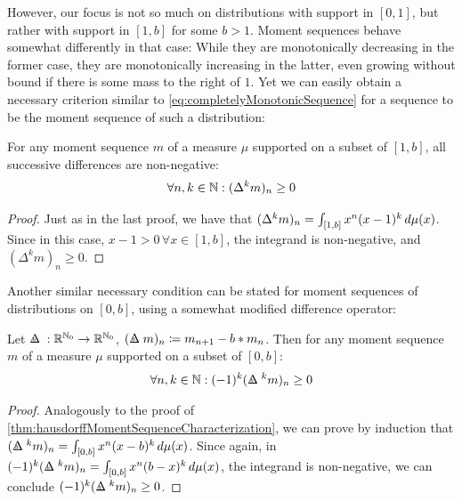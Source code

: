 \documentclass[a4paper]{scrreprt}
\begin{document}
    However, our focus is not so much on distributions with support in $[0, 1]$, but rather with support in $[1, b]$ for some $b > 1$.
    Moment sequences behave somewhat differently in that case: While they are monotonically decreasing in the former case, they are monotonically increasing in the latter, even growing without bound if there is some mass to the right of $1$.
    Yet we can easily obtain a necessary criterion similar to \eqref{eq:completelyMonotonicSequence} for a sequence to be the moment sequence of such a distribution:
    \begin{cor}
        For any moment sequence $m$ of a measure $\mu$ supported on a subset of $[1, b]$, all successive differences are non-negative:
        \begin{gather}
            \forall n, k \in \mathbb{N}: (\Delta^k m)_n \geq 0
        \end{gather}
        \label{cor:hausdorff-1-b-necessaryCondition}
    \end{cor}
    \begin{proof}
        Just as in the last proof, we have that $(\Delta^k m)_n = \int_{[1, b]} x^n (x-1)^k \, d\mu(x)$.
        Since in this case, $x-1 > 0 \,\forall x \in [1, b]$, the integrand is non-negative, and $(\Delta^k m)_n \geq 0$.
    \end{proof}

    Another similar necessary condition can be stated for moment sequences of distributions on $[0, b]$, using a somewhat modified difference operator:
    \newcommand{\DeltaB}[1]{\Delta\hspace{-.225cm}{\mathrel{\raisebox{0.045cm}{\scalebox{.9}{$\scriptscriptstyle#1$}}}\hspace{.22cm}}}
    \begin{lemma}
        Let $\DeltaB{b}: \R^{\N_0} \to \R^{\N_0}$, $(\DeltaB{b} m)_n \coloneqq m_{n+1} - b * m_n$.
        Then for any moment sequence $m$ of a measure $\mu$ supported on a subset of $[0, b]$:
        \begin{gather}            
            \forall n, k \in \N: (-1)^k (\DeltaB{b}^k m)_n \geq 0
        \end{gather}
        \label{lemma:hausdorff-0-b-necessaryCondition}
    \end{lemma}
    \begin{proof}
        Analogously to the proof of \ref{thm:hausdorffMomentSequenceCharacterization},
        we can prove by induction that $(\DeltaB{b}^k m)_n = \lintegral{[0, b]}{x^n (x-b)^k}{\mu(x)}$.
        Since again, in $(-1)^k (\DeltaB{b}^k m)_n = \lintegral{[0, b]}{x^n (b - x)^k}{\mu(x)}$, the integrand is non-negative, we can conclude $(-1)^k (\DeltaB{b}^k m)_n \geq 0$.
    \end{proof}
\end{document}
